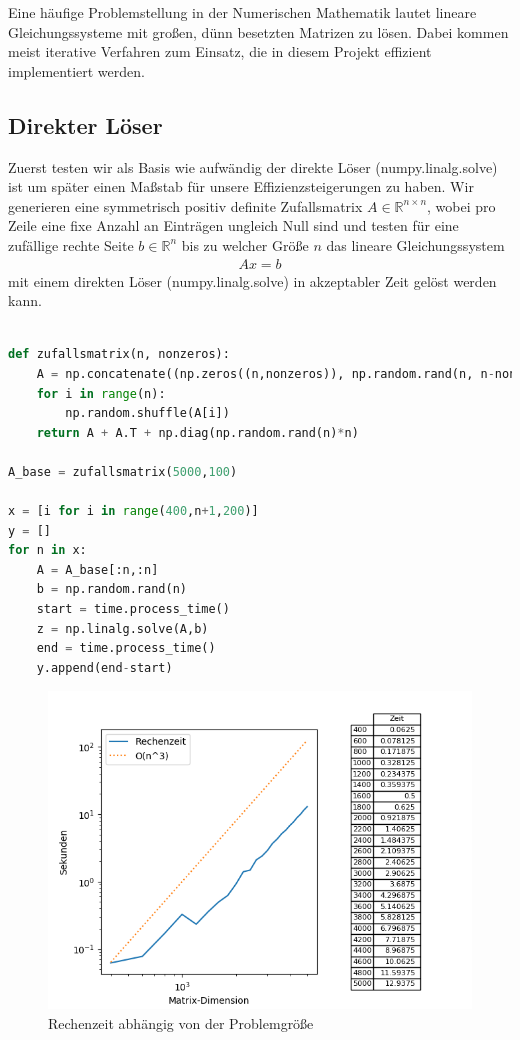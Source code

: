 Eine häufige Problemstellung in der Numerischen Mathematik lautet lineare Gleichungssysteme mit großen, dünn besetzten Matrizen zu lösen.
Dabei kommen meist iterative Verfahren zum Einsatz, die in diesem Projekt effizient implementiert werden.
\subsection{Direkter Löser}
Zuerst testen wir als Basis wie aufwändig der direkte Löser (numpy.linalg.solve) ist um später einen Maßstab für unsere
Effizienzsteigerungen zu haben.
Wir generieren eine symmetrisch positiv definite Zufallsmatrix $A \in \mathbb{R}^{n\times n}$, wobei pro Zeile eine fixe Anzahl an Einträgen
ungleich Null sind und testen für eine zufällige rechte Seite $b \in \mathbb{R}^n$ bis zu welcher Größe $n$ das lineare
Gleichungssystem
\begin{align*}
  Ax = b
\end{align*}
mit einem direkten Löser (numpy.linalg.solve) in akzeptabler Zeit gelöst werden kann.
\begin{lstlisting}[language=Python]

def zufallsmatrix(n, nonzeros):
	A = np.concatenate((np.zeros((n,nonzeros)), np.random.rand(n, n-nonzeros)), axis = 1)
	for i in range(n):
		np.random.shuffle(A[i])
	return A + A.T + np.diag(np.random.rand(n)*n)

A_base = zufallsmatrix(5000,100)

x = [i for i in range(400,n+1,200)]
y = []
for n in x:
	A = A_base[:n,:n]
	b = np.random.rand(n)
	start = time.process_time()
	z = np.linalg.solve(A,b)
	end = time.process_time()
	y.append(end-start)
\end{lstlisting}
\begin{figure}
    \centering
    \includegraphics[width=\linewidth]{Aufgabe_1/plot_a.png}
    \caption{Rechenzeit abhängig von der Problemgröße}
    \label{fig:my_label}
\end{figure}
